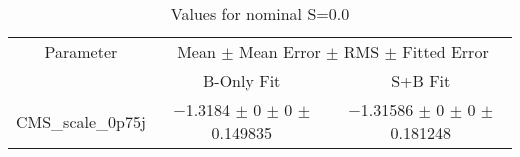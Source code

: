 \begin{table}
\centering
\caption{Values for nominal S=0.0}
\begin{tabular}{ccc}
\toprule
Parameter & \multicolumn{2}{c}{Mean $\pm$ Mean Error $\pm$ RMS $\pm$ Fitted Error}\\
 & B-Only Fit & S+B Fit\\
\midrule
CMS\_scale\_0p75j & \num{-1.3184} $\pm$ \num{0} $\pm$ \num{0} $\pm$ \num{0.149835} & \num{-1.31586} $\pm$ \num{0} $\pm$ \num{0} $\pm$ \num{0.181248}\\
\bottomrule
\end{tabular}
\end{table}